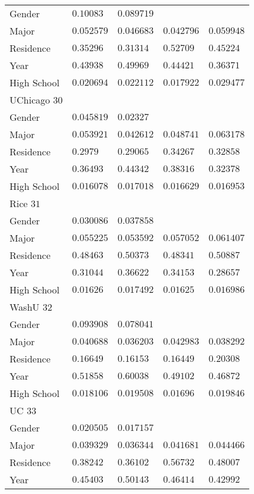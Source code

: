 \begin{center}
\begin{longtable}{|l|l|l|l|l|}
Gender & $0.10083$ & $0.089719$ & & \\
Major & $0.052579$ & $0.046683$ & $0.042796$ & $0.059948$ \\
Residence & $0.35296$ & $0.31314$ & $0.52709$ & $0.45224$ \\
Year & $0.43938$ & $0.49969$ & $0.44421$ & $0.36371$ \\
High School & $0.020694$ & $0.022112$ & $0.017922$ & $0.029477$ \\ \hline \hline
UChicago $30$ & & &   \\ \hline
Gender & $0.045819$ & $0.02327$ & & \\
Major & $0.053921$ & $0.042612$ & $0.048741$ & $0.063178$ \\
Residence & $0.2979$ & $0.29065$ & $0.34267$ & $0.32858$ \\
Year & $0.36493$ & $0.44342$ & $0.38316$ & $0.32378$ \\
High School & $0.016078$ & $0.017018$ & $0.016629$ & $0.016953$ \\ \hline \hline
Rice $31$ & & &   \\ \hline
Gender & $0.030086$ & $0.037858$ & & \\
Major & $0.055225$ & $0.053592$ & $0.057052$ & $0.061407$ \\
Residence & $0.48463$ & $0.50373$ & $0.48341$ & $0.50887$ \\
Year & $0.31044$ & $0.36622$ & $0.34153$ & $0.28657$ \\
High School & $0.01626$ & $0.017492$ & $0.01625$ & $0.016986$ \\ \hline \hline
WashU $32$ & & &   \\ \hline
Gender & $0.093908$ & $0.078041$ & & \\
Major & $0.040688$ & $0.036203$ & $0.042983$ & $0.038292$ \\
Residence & $0.16649$ & $0.16153$ & $0.16449$ & $0.20308$ \\
Year & $0.51858$ & $0.60038$ & $0.49102$ & $0.46872$ \\
High School & $0.018106$ & $0.019508$ & $0.01696$ & $0.019846$ \\ \hline \hline
UC $33$ & & &   \\ \hline
Gender & $0.020505$ & $0.017157$ & & \\
Major & $0.039329$ & $0.036344$ & $0.041681$ & $0.044466$ \\
Residence & $0.38242$ & $0.36102$ & $0.56732$ & $0.48007$ \\
Year & $0.45403$ & $0.50143$ & $0.46414$ & $0.42992$ \\

\end{longtable}
\end{center}
